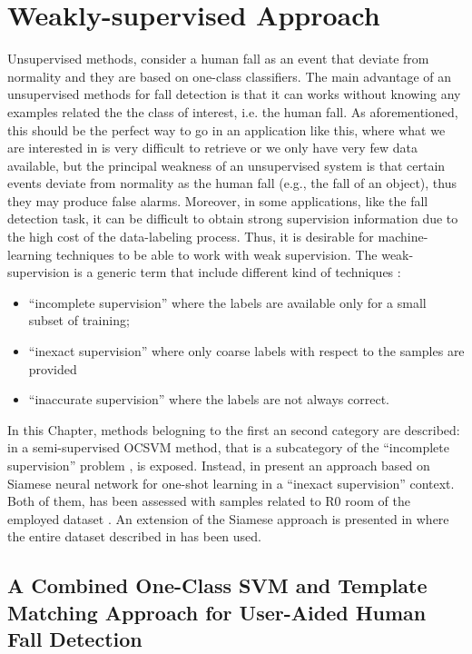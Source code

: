 \chapter{Weakly-supervised Approach}
\label{ch:weakley_supervised}
Unsupervised methods, consider a human fall as an event that deviate from normality and they are based on one-class classifiers. The main advantage of an unsupervised methods for fall detection is that it can works without knowing any examples related the the class of interest, i.e. the human fall. As aforementioned, this should be the perfect way to go in an application like this, where what we are interested in is very difficult to retrieve or we only have very few data available, but the principal weakness of an unsupervised system is that certain events deviate from normality as the human fall (e.g., the fall of an object), thus they may produce false alarms.
Moreover, in some applications, like the fall detection task, it can be difficult to obtain
strong supervision information due to the high cost of the data-labeling process. Thus, it is desirable for machine-learning techniques to be able to work with weak supervision.
The weak-supervision is a generic term that include different kind of techniques \cite{zhou2017brief}:
\begin{itemize}
	\item ``incomplete supervision'' where the labels are available only for a small subset of training;	
	\item ``inexact supervision'' where only coarse labels with respect to the samples are provided
	\item ``inaccurate supervision'' where the labels are not always correct.
\end{itemize}

In this Chapter, methods belogning to the first an second category are described: in  a semi-supervised OCSVM method, that is a subcategory of the ``incomplete supervision'' problem \cite{zhou2017brief}, is exposed. Instead, in  present an approach based on Siamese neural network for one-shot learning in a ``inexact supervision'' context. Both of them, has been assessed with samples related to R0 room of the employed dataset . An extension of the Siamese approach is presented in  where the entire dataset described in  has been used.




\section[A Combined OCSVM and Template Matching User-Aided Approach]{A Combined One-Class SVM and Template Matching Approach for User-Aided Human Fall Detection}
\label{sec:user_aided_cin}

